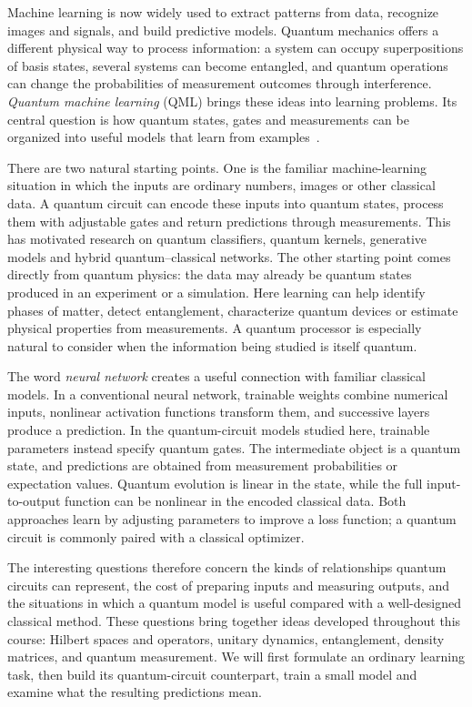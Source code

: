 Machine learning is now widely used to extract patterns from data, recognize images and signals, and build predictive models. Quantum mechanics offers a different physical way to process information: a system can occupy superpositions of basis states, several systems can become entangled, and quantum operations can change the probabilities of measurement outcomes through interference. \emph{Quantum machine learning} (QML) brings these ideas into learning problems. Its central question is how quantum states, gates and measurements can be organized into useful models that learn from examples~\cite{Cerezo2021}.

There are two natural starting points. One is the familiar machine-learning situation in which the inputs are ordinary numbers, images or other classical data. A quantum circuit can encode these inputs into quantum states, process them with adjustable gates and return predictions through measurements. This has motivated research on quantum classifiers, quantum kernels, generative models and hybrid quantum--classical networks. The other starting point comes directly from quantum physics: the data may already be quantum states produced in an experiment or a simulation. Here learning can help identify phases of matter, detect entanglement, characterize quantum devices or estimate physical properties from measurements. A quantum processor is especially natural to consider when the information being studied is itself quantum.

The word \emph{neural network} creates a useful connection with familiar classical models. In a conventional neural network, trainable weights combine numerical inputs, nonlinear activation functions transform them, and successive layers produce a prediction. In the quantum-circuit models studied here, trainable parameters instead specify quantum gates. The intermediate object is a quantum state, and predictions are obtained from measurement probabilities or expectation values. Quantum evolution is linear in the state, while the full input-to-output function can be nonlinear in the encoded classical data. Both approaches learn by adjusting parameters to improve a loss function; a quantum circuit is commonly paired with a classical optimizer.

The interesting questions therefore concern the kinds of relationships quantum circuits can represent, the cost of preparing inputs and measuring outputs, and the situations in which a quantum model is useful compared with a well-designed classical method. These questions bring together ideas developed throughout this course: Hilbert spaces and operators, unitary dynamics, entanglement, density matrices, and quantum measurement. We will first formulate an ordinary learning task, then build its quantum-circuit counterpart, train a small model and examine what the resulting predictions mean.

